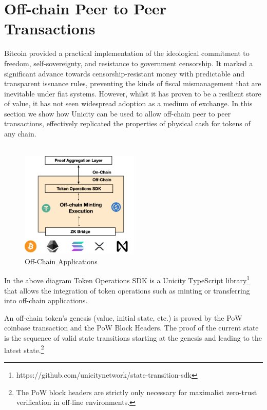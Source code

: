 \documentclass{article}
\begin{document}
\section{Off-chain Peer to Peer Transactions}

Bitcoin provided a practical implementation of the ideological commitment to freedom, self-sovereignty, and resistance to government censorship.  It marked a significant advance towards censorship-resistant money with predictable and transparent issuance rules, preventing the kinds of fiscal mismanagement that are inevitable under fiat systems. However, whilst it has proven to be a resilient store of value, it has not seen widespread adoption as a medium of exchange. In this section we show how Unicity can be used to allow off-chain peer to peer transactions, effectively replicated the properties of physical cash for tokens of any chain.
\\
\\

\begin{figure}[htbp]
    \centering
    \includegraphics[width=0.5\textwidth]{Unicity_Offchain.png}
    \caption{Off-Chain Applications}
    \label{fig:GenesisEvent}
\end{figure}

In the above diagram Token Operations SDK is a Unicity TypeScript library\footnote{https://github.com/unicitynetwork/state-transition-sdk} that allows the integration of token operations such as minting or transferring into off-chain applications.




An off-chain token's genesis (value, initial state, etc.) is proved by the PoW coinbase transaction and the PoW Block Headers. The proof of the current state is the sequence of valid state transitions starting at the genesis and leading to the latest state.\footnote{The PoW block headers are strictly only necessary for maximalist zero-trust verification in off-line environments.}
\end{document}
